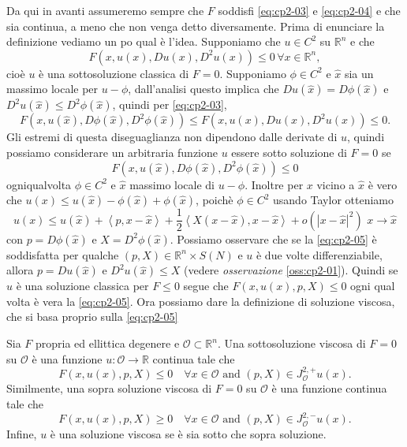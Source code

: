 Da qui in avanti assumeremo sempre che $F$ soddisfi \eqref{eq:cp2-03} e \eqref{eq:cp2-04} e che sia continua, a meno che non venga detto diversamente. Prima di enunciare la definizione vediamo un po qual è l'idea. Supponiamo che $u\in C^2$ su $\mathbb{R}^n$ e che
\[
F(x,u(x),Du(x),D^2u(x))\leq 0\, \forall x\in\mathbb{R}^n,
\]
cioè $u$ è una sottosoluzione classica di $F=0$. Supponiamo $\phi\in C^2$ e $\hat{x}$ sia un massimo locale per $u-\phi$, dall'analisi  questo implica che $Du(\hat{x})=D\phi(\hat{x})$ e $D^2u(\hat{x})\leq D^2\phi(\hat{x})$, quindi per \eqref{eq:cp2-03},
\[
F(x,u(\hat{x}),D\phi(\hat{x}),D^2\phi(\hat{x}))\leq F(x,u(x),Du(x),D^2u(x))\leq 0.
\]
Gli estremi di questa diseguaglianza non dipendono dalle derivate di $u$, quindi possiamo considerare un arbitraria funzione $u$ essere sotto soluzione di $F=0$ se
\begin{equation}
  \label{eq:cp2-01-add}
  F(x,u(\hat{x}),D\phi(\hat{x}),D^2\phi(\hat{x}))\leq 0
\end{equation}
ogniqualvolta $\phi\in C^2$ e $\hat{x}$ massimo locale di $u-\phi$.
Inoltre  per $x$ vicino a $\hat{x}$ è vero che $u(x)\leq u(\hat{x})-\phi(\hat{x}) + \phi(\hat{x})$, poichè $\phi\in C^2$ usando Taylor otteniamo
\begin{equation}
  \label{eq:cp2-05}
  u(x)\leq u(\hat{x})+\left<p,x-\hat{x}\right> + \frac{1}{2}\left<X(x-\hat{x}),x-\hat{x}\right> + o(|x-\hat{x}|^2)\,\, x\to\hat{x}
\end{equation}
con $p=D\phi(\hat{x})$ e $X=D^2\phi(\hat{x})$. Possiamo osservare che se la \eqref{eq:cp2-05} è soddisfatta per qualche $(p,X)\in\mathbb{R}^n\times S(N)$ e $u$ è due volte differenziabile, allora $p=Du(\hat{x})$ e $D^2u(\hat{x})\leq X$ (vedere \emph{osservazione} \ref{oss:cp2-01}). Quindi se $u$ è una soluzione classica per $F\leq 0$ segue che $F(x,u(x),p,X)\leq 0$ ogni qual volta è vera la \eqref{eq:cp2-05}. Ora possiamo dare la definizione di soluzione viscosa, che si basa proprio sulla \eqref{eq:cp2-05}
\begin{definizione}
\label{def:cp2-01}
Sia $F$ propria ed ellittica degenere e $\mathcal{O}\subset\mathbb{R}^n$.
Una sottosoluzione viscosa di $F=0$ su $\mathcal{O}$ è una funzione $u:\mathcal{O}\to\mathbb{R}$ continua tale che
\begin{equation}
  \label{eq:cp2-06}
  F(x,u(x),p,X)\leq 0\quad\forall x\in\mathcal{O}\text{ and }(p,X)\in J_{\mathcal{O}}^{2,+}u(x).
\end{equation}
Similmente, una sopra soluzione viscosa di $F=0$ su $\mathcal{O}$ è una funzione continua tale che
\begin{equation}
  \label{eq:cp2-07}
  F(x,u(x),p,X)\geq 0\quad\forall x\in\mathcal{O}\text{ and }(p,X)\in J_{\mathcal{O}}^{2,-}u(x).
\end{equation}
Infine, $u$ è una soluzione viscosa se è sia sotto che sopra soluzione.
\end{definizione}
